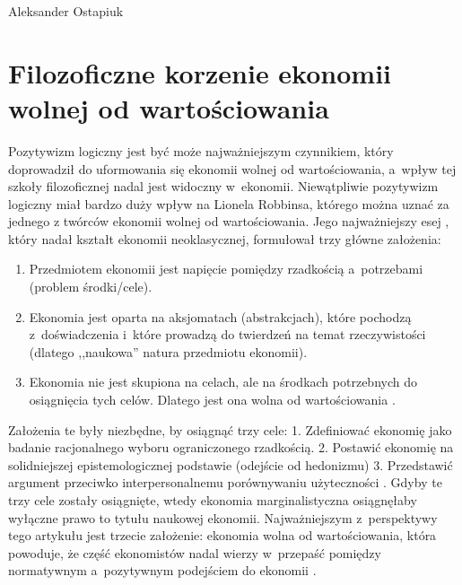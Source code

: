 \begin{artplenv}{Aleksander Ostapiuk}
\section{Filozoficzne korzenie ekonomii wolnej od wartościowania}
Pozytywizm logiczny jest być może najważniejszym czynnikiem, który doprowadził do uformowania się ekonomii wolnej od
wartościowania, a~wpływ tej szkoły filozoficznej nadal jest widoczny w~ekonomii. Niewątpliwie pozytywizm logiczny miał
bardzo duży wpływ na Lionela Robbinsa, którego można uznać za jednego z twórców ekonomii wolnej od wartościowania. Jego
najważniejszy esej
\parencite{robbins_essay_1935},
który nadał kształt ekonomii neoklasycznej, formułował trzy
główne założenia:

\begin{enumerate}
\item Przedmiotem ekonomii jest napięcie pomiędzy rzadkością a~potrzebami (problem środki/cele).
\item Ekonomia jest oparta na aksjomatach (abstrakcjach), które pochodzą z~doświadczenia i~które prowadzą do twierdzeń
na temat rzeczywistości (dlatego ,,naukowa'' natura przedmiotu ekonomii). 
\item Ekonomia nie jest skupiona na celach, ale na środkach potrzebnych do osiągnięcia tych celów. Dlatego jest ona wolna od
wartościowania
\parencite[s.~58]{witztum_ethics_2007}.
\end{enumerate}

Założenia te były niezbędne, by osiągnąć trzy cele: 1. Zdefiniować ekonomię jako badanie racjonalnego wyboru
ograniczonego rzadkością. 2. Postawić ekonomię na solidniejszej epistemologicznej podstawie (odejście od
hedonizmu) 3. Przedstawić argument przeciwko interpersonalnemu porównywaniu użyteczności
\parencite{hands_effective_2007}.
Gdyby te trzy cele zostały osiągnięte, wtedy ekonomia marginalistyczna osiągnęłaby wyłączne prawo to tytułu
naukowej ekonomii. Najważniejszym z~perspektywy tego artykułu jest trzecie założenie: ekonomia wolna od wartościowania,
która powoduje, że część ekonomistów nadal wierzy w~przepaść pomiędzy normatywnym a~pozytywnym
podejściem do ekonomii
\parencite{van_dalen_values_2019}.


\end{artplenv}

